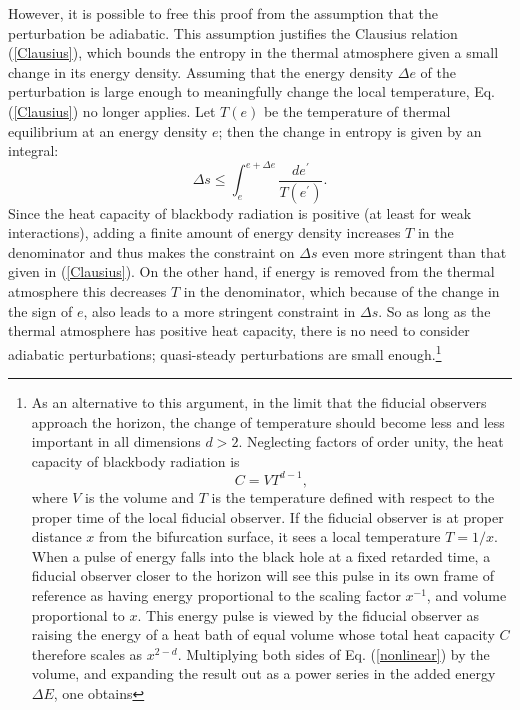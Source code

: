 \documentclass{article}
\begin{document}
However, it is possible to free this proof from the assumption that the perturbation be adiabatic.  This assumption justifies the Clausius relation (\ref{Clausius}), which bounds the entropy in the thermal atmosphere given a small change in its energy density.  Assuming that the energy density $\Delta e$ of the perturbation is large enough to meaningfully change the local temperature, Eq. (\ref{Clausius}) no longer applies.  Let $T(e)$ be the temperature of thermal equilibrium at an energy density $e$; then the change in entropy is given by an integral:
\begin{equation}\label{nonlinear}
\Delta s \le \int^{e + \Delta e}_e \!\frac{de^\prime}{T(e^{\prime})}.
\end{equation}
Since the heat capacity of blackbody radiation is positive (at least for weak interactions), adding a finite amount of energy density increases $T$ in the denominator and thus makes the constraint on $\Delta s$ even more stringent than that given in (\ref{Clausius}).  On the other hand, if energy is removed from the thermal atmosphere this decreases $T$ in the denominator, which because of the change in the sign of $e$, also leads to a more stringent constraint in $\Delta s$.  So as long as the thermal atmosphere has positive heat capacity, there is no need to consider adiabatic perturbations; quasi-steady perturbations are small enough.\footnote{As an alternative to this argument, in the limit that the fiducial observers approach the horizon, the change of temperature should become less and less important in all dimensions $d > 2$.  Neglecting factors of order unity, the heat capacity of blackbody radiation is \begin{equation}\label{cap}
C = VT^{d - 1},
\end{equation}
where $V$ is the volume and $T$ is the temperature defined with respect to the proper time of the local fiducial observer.  If the fiducial observer is at proper distance $x$ from the bifurcation surface, it sees a local temperature $T = 1/x$.  When a pulse of energy falls into the black hole at a fixed retarded time, a fiducial observer closer to the horizon will see this pulse in its own frame of reference as having energy proportional to the scaling factor $x^{-1}$, and volume proportional to $x$.  This energy pulse is viewed by the fiducial observer as raising the energy of a heat bath of equal volume whose total heat capacity $C$ therefore scales as $x^{2 - d}$.  Multiplying both sides of Eq. (\ref{nonlinear}) by the volume, and expanding the result out as a power series in the added energy $\Delta E$, one obtains
}
\end{document}
